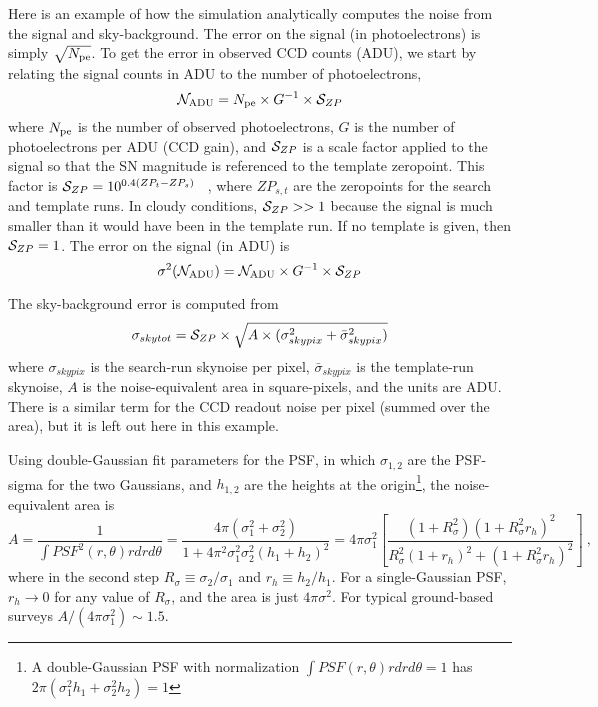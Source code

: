 \documentclass[12pt]{article}
\newcommand{\Rsig}{R_{\sigma}}
\newcommand{\rh}{r_{h}}
\newcommand{\SZP}{{\cal S}_{ZP}}
\newcommand{\NADU}{ {\cal N}_{\rm ADU}}
\newcommand{\Npe}{N_{\rm pe}}
\begin{document}
{Here is an example of how the simulation analytically computes the 
noise from the signal and sky-background.
The error on the signal (in photoelectrons) is simply $\sqrt{\Npe}$.
To get the error in observed CCD counts (ADU),
we start by relating the signal counts in ADU to the
number of photoelectrons,
%
\begin{equation}
  \NADU = \Npe \times G^{-1} \times \SZP
\end{equation}
%
where 
$\Npe$ is the number of observed photoelectrons,
$G$ is the number of photoelectrons per ADU (CCD gain),
and $\SZP$ is a scale factor applied to the signal so 
that the SN magnitude is referenced to the template zeropoint.
This factor is
%
   $\SZP = 10^{0.4(ZP_t - ZP_s)} $ ~,
%
where $ZP_{s,t}$ are the zeropoints for the search and template runs.
In cloudy conditions, $\SZP >> 1$ because the signal is much smaller
than it would have been in the template run.
If no template is given, then $\SZP = 1$.
The error on the signal (in ADU) is
%
\begin{equation}
   \sigma^2(\NADU) = \NADU \times G^{-1} \times \SZP
   \label{eq:sigmaNADU}
\end{equation}

\bigskip
The sky-background error is computed from
%
\begin{equation}
   \sigma_{skytot} = 
   \SZP \times 
   \sqrt{ A \times (\sigma_{skypix}^2 + \bar{\sigma}_{skypix}^2 ) }
\end{equation}
%
where $\sigma_{skypix}$ is the search-run skynoise per pixel,
$\bar{\sigma}_{skypix}$ is the template-run skynoise,
$A$ is the noise-equivalent area in square-pixels, 
and the units are ADU.
There is a similar term for the CCD readout noise per pixel
(summed over the area), but it is left out here in this example.


Using double-Gaussian fit
parameters for the PSF, in which $\sigma_{1,2}$ are the
PSF-sigma for the two Gaussians, and $h_{1,2}$ are the
heights at the origin\footnote{A double-Gaussian PSF with normalization
  $\int PSF(r,\theta) r drd\theta = 1$
  has $2\pi(\sigma_1^2 h_1 + \sigma_2^2 h_2) = 1$}, 
the noise-equivalent area is
%
\begin{equation}
   A = \frac{1}{\int PSF^2(r,\theta) r dr d\theta}
  = \frac{4\pi ( \sigma_1^2 + \sigma_2^2) }
    {1 + 4\pi^2\sigma_1^2\sigma_2^2(h_1 + h_2)^2 }
  = 4\pi\sigma_1^2 \left[ 
      \frac{ (1+\Rsig^2)(1+\Rsig^2\rh)^2 }{\Rsig^2(1+\rh)^2 + (1+\Rsig^2\rh)^2}
      \right]~,
   \label{eq:NEA_formula}
\end{equation}
%
where in the second step $\Rsig \equiv \sigma_2/\sigma_1$
and $\rh \equiv h_2/h_1$.
For a single-Gaussian PSF, $\rh \to 0$ for any value of $\Rsig$,
and the area is just $4\pi\sigma^2$.
For typical ground-based surveys $A/(4\pi\sigma_1^2) \sim 1.5$.



}
\end{document}
